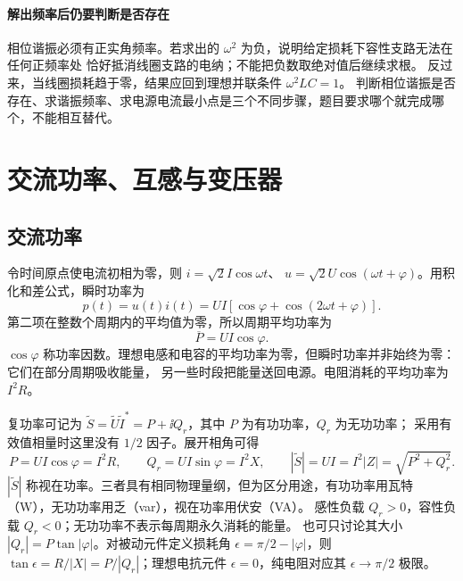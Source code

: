 
\paragraph{解出频率后仍要判断是否存在}
相位谐振必须有正实角频率。若求出的 $\omega^2$ 为负，说明给定损耗下容性支路无法在任何正频率处
恰好抵消线圈支路的电纳；不能把负数取绝对值后继续求根。
反过来，当线圈损耗趋于零，结果应回到理想并联条件 $\omega^2LC=1$。
判断相位谐振是否存在、求谐振频率、求电源电流最小点是三个不同步骤，题目要求哪个就完成哪个，不能相互替代。




\section{交流功率、互感与变压器}

\subsection{交流功率}


令时间原点使电流初相为零，则 $i=\sqrt2 I\cos\omega t$、
$u=\sqrt2 U\cos(\omega t+\varphi)$。用积化和差公式，瞬时功率为
\begin{equation}
 p(t)=u(t)i(t)=UI[\cos\varphi+\cos(2\omega t+\varphi)].
\end{equation}
第二项在整数个周期内的平均值为零，所以周期平均功率为
\begin{equation}
 \overline P=UI\cos\varphi.
\end{equation}
$\cos\varphi$ 称功率因数。理想电感和电容的平均功率为零，但瞬时功率并非始终为零：它们在部分周期吸收能量，
另一些时段把能量送回电源。电阻消耗的平均功率为 $I^2R$。

复功率可记为 $\widetilde S=\widetilde U\widetilde I^*=P+\ii Q_r$，其中 $P$ 为有功功率，$Q_r$ 为无功功率；
采用有效值相量时这里没有 $1/2$ 因子。展开相角可得
\begin{equation}
 P=UI\cos\varphi=I^2R,\qquad Q_r=UI\sin\varphi=I^2X,
 \qquad |\widetilde S|=UI=I^2|Z|=\sqrt{P^2+Q_r^2}.
\end{equation}
$|\widetilde S|$ 称视在功率。三者具有相同物理量纲，但为区分用途，有功功率用瓦特（W），无功功率用乏（var），视在功率用伏安（VA）。
感性负载 $Q_r>0$，容性负载 $Q_r<0$；无功功率不表示每周期永久消耗的能量。
也可只讨论其大小 $|Q_r|=P\tan|\varphi|$。对被动元件定义损耗角
$\epsilon=\pi/2-|\varphi|$，则 $\tan\epsilon=R/|X|=P/|Q_r|$；理想电抗元件 $\epsilon=0$，纯电阻对应其 $\epsilon\to\pi/2$ 极限。


